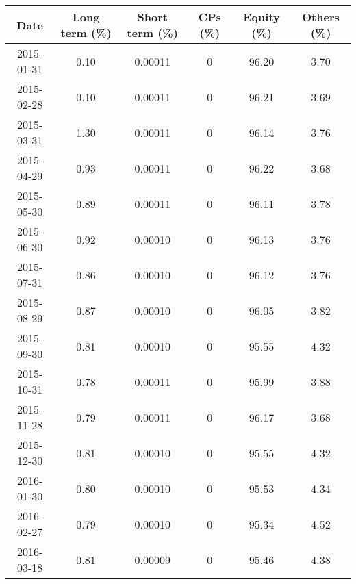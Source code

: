 \begin{table}[ht]
\centering
\begin{tabular}{cccccc}
  \hline
  Date & Long term (\%)& Short term (\%) & CPs (\%) & Equity (\%)  & Others (\%) \\  
  \hline
  2015-01-31 & 0.10 & 0.00011 & 0 & 96.20 & 3.70 \\ 
  2015-02-28 & 0.10 & 0.00011 & 0 & 96.21 & 3.69 \\ 
  2015-03-31 & 1.30 & 0.00011 & 0 & 96.14 & 3.76 \\ 
  2015-04-29 & 0.93 & 0.00011 & 0 & 96.22 & 3.68 \\ 
  2015-05-30 & 0.89 & 0.00011 & 0 & 96.11 & 3.78 \\ 
  2015-06-30 & 0.92 & 0.00010 & 0 & 96.13 & 3.76 \\ 
  2015-07-31 & 0.86 & 0.00010 & 0 & 96.12 & 3.76 \\ 
  2015-08-29 & 0.87 & 0.00010 & 0 & 96.05 & 3.82 \\ 
  2015-09-30 & 0.81 & 0.00010 & 0 & 95.55 & 4.32 \\ 
  2015-10-31 & 0.78 & 0.00011 & 0 & 95.99 & 3.88 \\ 
  2015-11-28 & 0.79 & 0.00011 & 0 & 96.17 & 3.68 \\ 
  2015-12-30 & 0.81 & 0.00010 & 0 & 95.55 & 4.32 \\ 
  2016-01-30 & 0.80 & 0.00010 & 0 & 95.53 & 4.34 \\ 
  2016-02-27 & 0.79 & 0.00010 & 0 & 95.34 & 4.52 \\ 
  2016-03-18 & 0.81 & 0.00009 & 0 & 95.46 & 4.38 \\ 
  \hline
\end{tabular}
\end{table}
